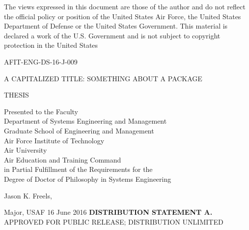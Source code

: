 \documentclass[12pt,letterpaper,oneside]{book}
\begin{document}
	\thispagestyle{empty}
	\singlespacing
	\null	
	\vfill 
	\noindent The views expressed in this document are those of the
author and do not reflect the official policy or position of the
United States Air Force, the United States Department of Defense or
the United States Government.  This material is declared a work of the
U.S. Government and is not subject to copyright protection in the
United States
	\vfill 
	\doublespacing
	\newpage
	\pagestyle{plain}
    \begin{titlepage}
	\thispagestyle{empty}
	\noindent AFIT-ENG-DS-16-J-009  
	\vfill
	\begin{center}
	    \MakeUppercase{A Capitalized Title: Something about a Package}\par
	    \vskip 1cm
	    \MakeUppercase{Thesis}\par
	    \vskip 1cm
	    Presented to the Faculty\\
	    Department of Systems Engineering and Management\\
	    Graduate School of Engineering and Management~\\
	    Air Force Institute of Technology~\\
	    Air University~\\
	    Air Education and Training Command~\\
	    in Partial Fulfillment of the Requirements for the~\\
	    Degree of Doctor of Philosophy in Systems Engineering\\
	    \vskip 1cm
	    {Jason K. Freels, \par}
	    {Major, \MakeUppercase{usaf}}
	    \vskip 1cm
	    16 June 2016
	    \vskip 1cm
	    	    \MakeUppercase{\textbf{distribution statement a.}}\\ 
	    \MakeUppercase{Approved for Public Release; distribution unlimited}
	    	    \vfill
	\end{center}
	\newpage 
	\pagestyle{plain}
    \end{titlepage}
	\thispagestyle{empty}
\end{document}
